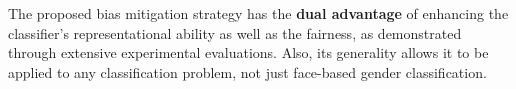\documentclass[runningheads]{llncs}
\begin{document}
The proposed bias mitigation strategy has the \textbf{dual advantage} of enhancing the classifier's representational ability as well as the fairness, as demonstrated through extensive experimental evaluations. Also, its generality allows it to be applied to any classification problem, not just face-based gender classification.





















\begin{comment}
Motivated by structured learning~\cite{neural_graph_learning, ssl_gcn, goodfellow_adverarial, miyato} and generative views literature~\cite{ensembling_views}, we propose a solution based on deep generative views of the real facial images along with the neighbour-loss based regularizer for bias mitigation of the gender classification system. Our proposed method is based on training a StyleGAN based generative model that can produce synthetic data of the same distribution. Subsequently, we trained an encoder for the trained StyleGAN for inverting our training set images to the GAN latent space such that we can perturb the latent vectors to produce variations of the input image called \emph{neighbouring views}. We introduce a regularizing term (Neighbour Loss) to the loss function, which calculate the distance between the source and neighbour embedding. The proposed method improves the classification performance from the baseline as well as improves the fairness of the model significantly, contrary to previous attempts where it is a trade-off between the two.
\end{comment}









\begin{comment}
We also introduce a reject-option method based on uncertainty prediction introduced by evidential deep learning. By replacing the classification head with an evidential layer that outputs a Dirichlet distribution and a corresponding loss, the model acquires the ability to not only predict the class but also to predict the uncertainty of its prediction. We use this model's own prediction of uncertainty as a means of rejection threshold and observe that  ... \end{comment}
\end{document}
